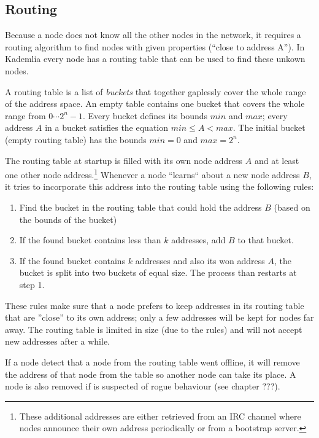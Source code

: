 \documentclass[a4paper,8pt,twocolumn]{scrartcl}
\begin{document}
\subsection{Routing}

Because a node does not know all the other nodes in the network, it requires a routing algorithm to find nodes with given properties (``close to address A''). In Kademlia every node has a routing table that can be used to find these unkown nodes.

A routing table is a list of {\it buckets} that together gaplessly cover the whole range of the address space. An empty table contains one bucket that covers the whole range from $0\cdots 2^n-1$. Every bucket defines its bounds $min$ and $max$; every address $A$ in a bucket satisfies the equation $min \leq A < max$. The initial bucket (empty routing table) has the bounds $min = 0$ and $max = 2^n$.

The routing table at startup is filled with its own node address $A$ and at least one other node address.\footnote{These additional addresses are either retrieved from an IRC channel where nodes announce their own address periodically or from a bootstrap server.} Whenever a node ``learns`` about a new node address $B$, it tries to incorporate this address into the routing table using the following rules:

\begin{enumerate}
 \item Find the bucket in the routing table that could hold the address $B$ (based on the bounds of the bucket)
 \item If the found bucket contains less than $k$ addresses, add $B$ to that bucket.
 \item If the found bucket contains $k$ addresses and also its won address $A$, the bucket is split into two buckets of equal size. The process than restarts at step 1.
\end{enumerate}

These rules make sure that a node prefers to keep addresses in its routing table that are ''close'' to its own address; only a few addresses will be kept for nodes far away. The routing table is limited in size (due to the rules) and will not accept new addresses after a while.

If a node detect that a node from the routing table went offline, it will remove the address of that node from the table so another node can take its place. A node is also removed if is suspected of rogue behaviour (see chapter ???).
\end{document}
